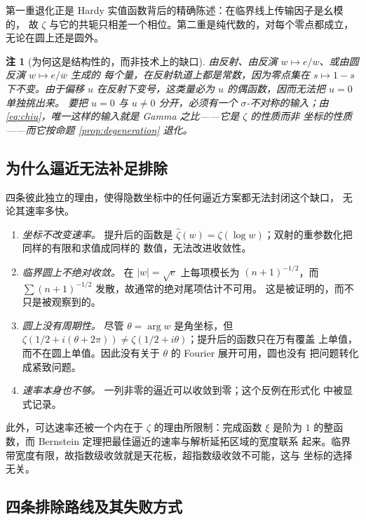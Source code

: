 \documentclass[submission,noinfoline]{jsfds}
\newtheorem*{remark}{注}
\newcommand{\Lean}[1]{}
\newcommand{\abs}[1]{\lvert #1\rvert}
\begin{document}
第一重退化正是 Hardy 实值函数背后的精确陈述：在临界线上传输因子是幺模的，
故 $\zeta$ 与它的共轭只相差一个相位。第二重是纯代数的，对每个零点都成立，
无论在圆上还是圆外。

\begin{remark}[为何这是结构性的，而非技术上的缺口]
由反射、由反演 $w\mapsto e/w$、或由圆反演 $w\mapsto e/\overline w$ 生成的
每个量，在反射轨道上都是常数，因为零点集在 $s\mapsto1-s$ 下不变。由于偏移
$u$ 在反射下变号，这类量必为 $u$ 的偶函数，因而无法把 $u=0$ 单独挑出来。
要把 $u=0$ 与 $u\neq0$ 分开，必须有一个 $\sigma$-不对称的输入；由
\eqref{eq:chiu}，唯一这样的输入就是 Gamma 之比——它是 $\zeta$ 的性质而非
坐标的性质——而它按命题 \ref{prop:degeneration} 退化。
\end{remark}

\subsection{为什么逼近无法补足排除}

四条彼此独立的理由，使得隐数坐标中的任何逼近方案都无法封闭这个缺口，
无论其速率多快。

\begin{enumerate}
\item \emph{坐标不改变速率。} 提升后的函数是
$\widehat\zeta(w)=\zeta(\log w)$；双射的重参数化把同样的有限和求值成同样的
数值，无法改进收敛性。
\item \emph{临界圆上不绝对收敛。} 在 $\abs w=\sqrt e$ 上每项模长为
$(n+1)^{-1/2}$，而 $\sum (n+1)^{-1/2}$ 发散，故通常的绝对尾项估计不可用。
这是被证明的，而不只是被观察到的。
\Lean{critical_lifted_terms_not_summable}
\item \emph{圆上没有周期性。} 尽管 $\theta=\arg w$ 是角坐标，但
$\zeta(1/2+i(\theta+2\pi))\neq\zeta(1/2+i\theta)$；提升后的函数只在万有覆盖
上单值，而不在圆上单值。因此没有关于 $\theta$ 的 Fourier 展开可用，圆也没有
把问题转化成紧致问题。
\item \emph{速率本身也不够。} 一列非零的逼近可以收敛到零；这个反例在形式化
中被显式记录。\Lean{nonzero_approximants_can_converge_to_zero}
\end{enumerate}

此外，可达速率还被一个内在于 $\zeta$ 的理由所限制：完成函数 $\xi$ 是阶为
$1$ 的整函数，而 Bernstein 定理把最佳逼近的速率与解析延拓区域的宽度联系
起来。临界带宽度有限，故指数级收敛就是天花板，超指数级收敛不可能，这与
坐标的选择无关。

\subsection{四条排除路线及其失败方式}
\end{document}
